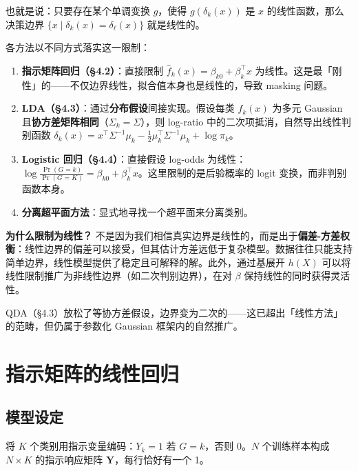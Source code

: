 也就是说：只要存在某个单调变换 $g$，使得 $g(\delta_k(x))$ 是 $x$ 的线性函数，那么决策边界 $\{x\mid \delta_k(x)=\delta_\ell(x)\}$ 就是线性的。

各方法以不同方式落实这一限制：

\begin{enumerate}[label=(\arabic*)]
    \item \textbf{指示矩阵回归（\S4.2）}：直接限制 $\hat{f}_k(x) = \beta_{k0} + \beta_k^\top x$ 为线性。这是最「刚性」的——不仅边界线性，拟合值本身也是线性的，导致 masking 问题。
    \item \textbf{LDA（\S4.3）}：通过\textbf{分布假设}间接实现。假设每类 $f_k(x)$ 为多元 Gaussian 且\textbf{协方差矩阵相同}（$\Sigma_k=\Sigma$），则 log-ratio 中的二次项抵消，自然导出线性判别函数 $\delta_k(x)=x^\top\Sigma^{-1}\mu_k - \frac12\mu_k^\top\Sigma^{-1}\mu_k + \log\pi_k$。
    \item \textbf{Logistic 回归（\S4.4）}：直接假设 log-odds 为线性：$\log\frac{\Pr(G=k)}{\Pr(G=K)}=\beta_{k0}+\beta_k^\top x$。这里限制的是后验概率的 logit 变换，而非判别函数本身。
    \item \textbf{分离超平面方法}：显式地寻找一个超平面来分离类别。
\end{enumerate}

\textbf{为什么限制为线性？} 不是因为我们相信真实边界是线性的，而是出于\textbf{偏差-方差权衡}：线性边界的偏差可以接受，但其估计方差远低于复杂模型。数据往往只能支持简单边界，线性模型提供了稳定且可解释的解。此外，通过基展开 $h(X)$ 可以将线性限制推广为非线性边界（如二次判别边界），在对 $\beta$ 保持线性的同时获得灵活性。

\begin{remark}
QDA（\S4.3）放松了等协方差假设，边界变为二次的——这已超出「线性方法」的范畴，但仍属于参数化 Gaussian 框架内的自然推广。
\end{remark}


\section{指示矩阵的线性回归}

\subsection{模型设定}

将 $K$ 个类别用指示变量编码：$Y_k = 1$ 若 $G = k$，否则 $0$。$N$ 个训练样本构成 $N \times K$ 的指示响应矩阵 $\mathbf{Y}$，每行恰好有一个 1。

